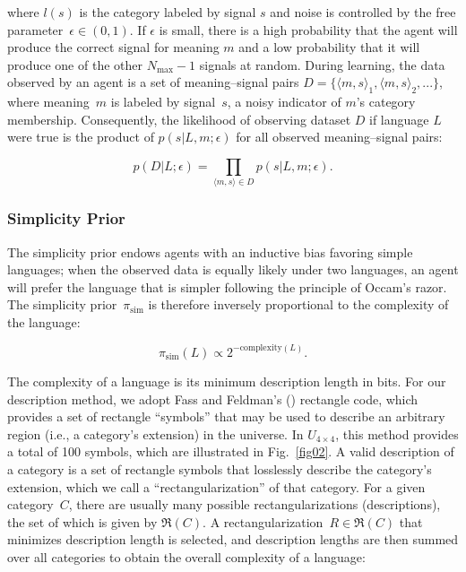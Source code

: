 \documentclass[doc,biblatex]{apa7}
\begin{document}
\noindent where $l(s)$ is the category labeled by signal $s$ and noise is controlled by the free parameter~$\epsilon \in (0,1)$. If $\epsilon$ is small, there is a high probability that the agent will produce the correct signal for meaning $m$ and a low probability that it will produce one of the other $N_\mathrm{max} - 1$ signals at random. During learning, the data observed by an agent is a set of meaning--signal pairs $D = \{\langle m,s \rangle_1, \langle m,s \rangle_2, ...\}$, where meaning~$m$ is labeled by signal~$s$, a noisy indicator of $m$'s category membership. Consequently, the likelihood of observing dataset $D$ if language $L$ were true is the product of $p(s|L,m; \epsilon)$ for all observed meaning--signal pairs:

	\begin{equation}
	p(D|L; \epsilon) = \prod_{\langle m,s \rangle \in D} p(s|L,m; \epsilon).
	\label{likelihood}
	\end{equation}

\subsubsection{Simplicity Prior}

The simplicity prior endows agents with an inductive bias favoring simple languages; when the observed data is equally likely under two languages, an agent will prefer the language that is simpler following the principle of Occam's razor. The simplicity prior~$\pi_\mathrm{sim}$ is therefore inversely proportional to the complexity of the language:

	\begin{equation}
	\pi_\mathrm{sim}(L) \propto 2^{-\mathrm{complexity}(L)}.
	\label{prior_sim}
	\end{equation}

\noindent The complexity of a language is its minimum description length in bits. For our description method, we adopt Fass and Feldman's (\citeyear{Fass:2002}) rectangle code, which provides a set of rectangle ``symbols'' that may be used to describe an arbitrary region (i.e., a category's extension) in the universe. In $U_{4 \times 4}$, this method provides a total of 100 symbols, which are illustrated in Fig.~\ref{fig02}. A valid description of a category is a set of rectangle symbols that losslessly describe the category's extension, which we call a ``rectangularization'' of that category. For a given category~$C$, there are usually many possible rectangularizations (descriptions), the set of which is given by $\Re(C)$. A rectangularization~$R \in \Re(C)$ that minimizes description length is selected, and description lengths are then summed over all categories to obtain the overall complexity of a language:
\end{document}
